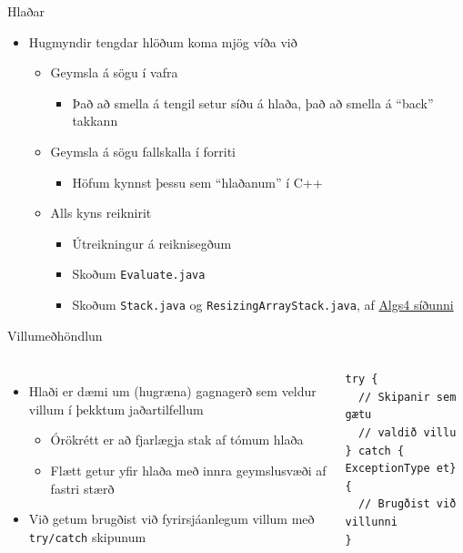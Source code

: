 \documentclass{beamer}
\begin{document}
\begin{frame}{Hlaðar}
	\begin{itemize}
		\item Hugmyndir tengdar hlöðum koma mjög víða við
		      \begin{itemize}
			      \item Geymsla á sögu í vafra
			            \begin{itemize}
				            \item Það að smella á tengil setur síðu á hlaða, það að smella á ``back'' takkann
			            \end{itemize}
			      \item Geymsla á sögu fallskalla í forriti
			            \begin{itemize}
				            \item Höfum kynnst þessu sem ``hlaðanum'' í C++
			            \end{itemize}
			      \item Alls kyns reiknirit
			            \begin{itemize}
				            \item Útreikningur á reiknisegðum
				            \item Skoðum  \texttt{Evaluate.java}
				            \item Skoðum \texttt{Stack.java} og \texttt{ResizingArrayStack.java},  af \href{https://algs4.cs.princeton.edu/code/}{Algs4 síðunni}
			            \end{itemize}
		      \end{itemize}
	\end{itemize}
\end{frame}

\begin{frame}[fragile]{Villumeðhöndlun}
	\begin{columns}
		\begin{itemize}
			\item Hlaði er dæmi um (hugræna) gagnagerð sem veldur villum í þekktum jaðartilfellum
			      \begin{itemize}
				      \item Órökrétt er að fjarlægja stak af tómum hlaða
				      \item Flætt getur yfir hlaða með innra geymslusvæði af fastri stærð
			      \end{itemize}
			\item Við getum brugðist við fyrirsjáanlegum villum með \texttt{try/catch} skipunum
		\end{itemize}
		\begin{verbatim}
try {
  // Skipanir sem gætu 
  // valdið villu
} catch { ExceptionType et} {
  // Brugðist við villunni
}
	\end{verbatim}
	\end{columns}
\end{frame}
\end{document}
